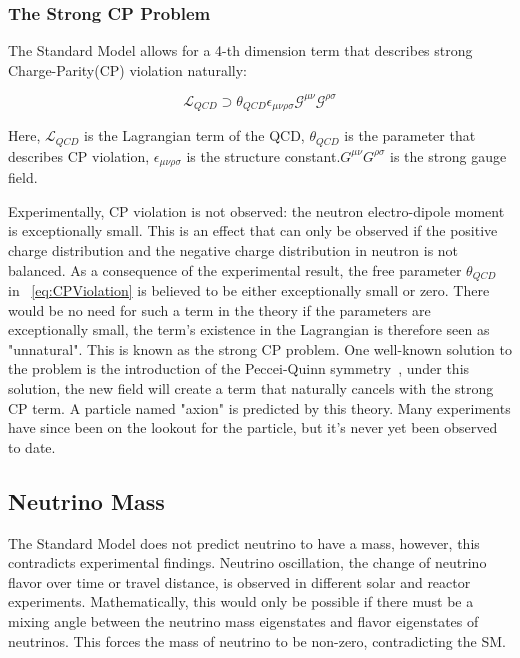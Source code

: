 \subsubsection{The Strong CP Problem}
The Standard Model allows for a 4-th dimension term that describes strong Charge-Parity(CP) violation naturally:

\begin{equation}
    \mathcal{L}_{QCD} \supset \theta_{QCD}\epsilon_{\mu\nu\rho\sigma} \mathcal{G}^{\mu\nu}\mathcal{G}^{\rho\sigma}
    \label{eq:CPViolation}
\end{equation}

Here, $\mathcal{L}_{QCD}$ is the Lagrangian term of the QCD, $\theta_{QCD}
$ is the parameter that describes CP violation,  $\epsilon_{\mu\nu\rho\sigma}$ is the structure constant.$G^{\mu\nu}G^{\rho\sigma}$ is the strong gauge field.

Experimentally, CP violation is not observed: the neutron electro-dipole moment is exceptionally small\cite{PhysRevLett.124.081803}. This is an effect that can only be observed if the positive charge distribution and the negative charge distribution in neutron is not balanced. As a consequence of the experimental result, the free parameter $\theta_{QCD}$ in ~\ref{eq:CPViolation} is believed to be either exceptionally small or zero. There would be no need for such a term in the theory if the
parameters are exceptionally small, the term's existence in the Lagrangian is therefore seen as "unnatural". This is known as the strong CP problem.
One well-known solution to the problem is the introduction of the Peccei-Quinn symmetry~\cite{PQSym}, under this solution, the new field will create a term that naturally cancels with the strong CP term. A particle named "axion" is predicted by this theory. Many experiments have since been on the lookout for the particle, but it's never yet been observed to date.

\subsection{Neutrino Mass}
The Standard Model does not predict neutrino to have a mass, however, this contradicts experimental findings. Neutrino oscillation, the change of neutrino flavor over time or travel distance, is observed in different solar and reactor experiments. Mathematically, this would only be possible if there must be a mixing angle between the neutrino mass eigenstates and flavor eigenstates of neutrinos. This forces the mass of neutrino to be non-zero, contradicting the SM.

